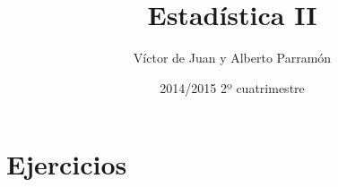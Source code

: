 \documentclass[nochap]{apuntes}
\author{Víctor de Juan y Alberto Parramón}
\date{2014/2015 2º cuatrimestre}
\title{Estadística II}
\begin{document}
\pagestyle{plain}
\maketitle

\tableofcontents
\newpage








\appendix
\chapter{Ejercicios}

\end{document}
